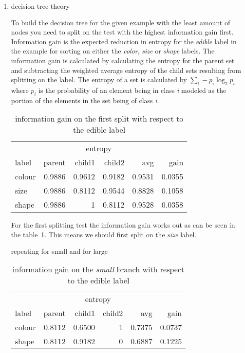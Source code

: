 \documentclass[11pt]{article}
\begin{document}
\begin{enumerate}

\item decision tree theory

To build the decision tree for the given example with the least amount of nodes you need to split on the test with the highest information gain first. Information gain is the expected reduction in entropy for the \emph{edible} label in the example for sorting on either the \emph{color}, \emph{size} or \emph{shape} labels. The information gain is calculated by calculating the entropy for the parent set and subtracting the weighted average entropy of the child sets resulting from splitting on the label. The entropy of a set is calculated by $\sum\limits_i - p_i \log_2 p_i $ where $p_i$ is the probability of an element being in class \emph{i} modeled as the portion of the elements in the set being of class \emph{i}.

\begin{table}[h]
\label{tab:gain}
\begin{tabular}{ l r r r r r }
& \multicolumn{4}{c}{entropy} & \\
\cline{2-5}
label & parent & child1 & child2 & avg & gain \\
\hline
colour & 0.9886 & 0.9612 & 0.9182 & 0.9531 & 0.0355 \\
size & 0.9886 & 0.8112 & 0.9544 & 0.8828 & 0.1058 \\
shape & 0.9886 & 1 & 0.8112 & 0.9528 & 0.0358 \\
\end{tabular}
\caption{information gain on the first split with respect to the edible label}
\end{table}


For the first splitting test the information gain works out as can be seen in the table~\ref{tab:gain}. This means we should first split on the \emph{size} label.

repeating for small and for large

\begin{table}[h]
\label{tab:gain-small}
\begin{tabular}{ l r r r r r }
& \multicolumn{4}{c}{entropy} & \\
\cline{2-5}
label & parent & child1 & child2 & avg & gain \\
\hline
colour & 0.8112 & 0.6500 & 1 & 0.7375 & 0.0737 \\
shape & 0.8112 & 0.9182 & 0 & 0.6887 & 0.1225 \\
\end{tabular}
\caption{information gain on the \emph{small} branch with respect to the edible label}
\end{table}


\end{enumerate}
\end{document}
